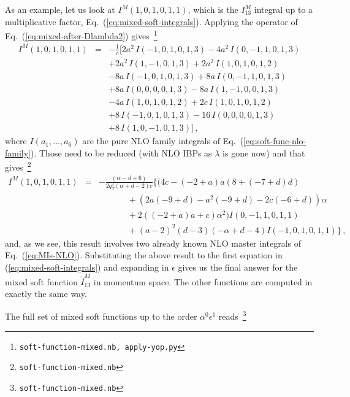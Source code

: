 \documentclass[a4paper,11pt]{report}
\numberwithin{equation}{section}
\newcommand{\mixed}{{M}}
\newcommand{\mycite}[1]{{\footnote{\tt  #1}}}
\begin{document}
As an example, let us look at 
$I^\mixed (1,0,1,0,1,1)$, which is the $I^\mixed_{13}$ integral
up to a multiplicative factor, \cf Eq.~(\ref{eq:mixed-soft-integrals}).
%
Applying the operator of Eq.~(\ref{eq:mixed-after-Dlambda2})
gives~\mycite{soft-function-mixed.nb, apply-yop.py}
%
\begin{eqnarray}
  I^\mixed (1,0,1,0,1,1) & = &
  -\frac{1}{c} \Big [
  2 a^2 \,I(-1,0,1,0,1,3)-4 a^2 \,I(0,-1,1,0,1,3)
  \nonumber \\
  & & +2 a^2\,I(1,-1,0,1,3)+2 a^2 \,I(1,0,1,0,1,2)
  \nonumber \\
  & & -8 a \,I(-1,0,1,0,1,3)+8 a \,I(0,-1,1,0,1,3)
  \nonumber \\
  & & +8 a \,I(0,0,0,0,1,3)-8 a \,I(1,-1,0,0,1,3)
  \nonumber \\
  & & -4 a \,I(1,0,1,0,1,2)+2 c \,I(1,0,1,0,1,2)
  \nonumber \\
  & & +8 \,I(-1,0,1,0,1,3)-16 \,I(0,0,0,0,1,3)
  \nonumber \\
  & & +8 \,I(1,0,-1,0,1,3) \Big] \,,
  \label{eq:I13mixed-example-befor-reduction}
\end{eqnarray}
%
where $I(a_1,\ldots, a_6)$ are the pure NLO family integrals
of Eq.~(\ref{eq:soft-func-nlo-family}).
%
Those need to be reduced  (with NLO IBPs as $\lambda$ is gone now) and that
gives~\mycite{soft-function-mixed.nb}
\begin{eqnarray}
  I^\mixed (1,0,1,0,1,1) & = &
  - \frac{(\alpha -d+6)}{2 q_T^4 (\alpha +d-2) c} 
  \Big\{
    \Big(4 c - (-2 + a) a (8 + (-7 + d) d)
  \nonumber \\
  & & 
    \hspace{40pt}
    + (2 a (-9 + d) - a^2 (-9 + d) - 
    2 c (-6 + d)) \alpha 
  \nonumber \\
  & & 
    \hspace{40pt}
    + 2 ((-2 + a) a + c) \alpha^2\Big) 
    I(0,-1,1,0,1,1)
  \nonumber \\
  & & 
    \hspace{40pt}
    +(a-2)^2 (d-3) (-\alpha +d-4) 
    I(-1,0,1,0,1,1)
  \Big\}\,,
\end{eqnarray}
%
and, as we see, this result involves two already known NLO master integrals of
Eq.~(\ref{eq:MIs-NLO}). Substituting the above result to the first equation in 
(\ref{eq:mixed-soft-integrals}) and expanding in $\epsilon$ gives us the final
answer for the mixed soft function $\tilde I^M_{13}$ in momentum space. The
other functions are computed in exactly the same way.

The full set of mixed soft functions up to the order $\alpha^0 \epsilon^1$ reads~\mycite{soft-function-mixed.nb}
\end{document}
